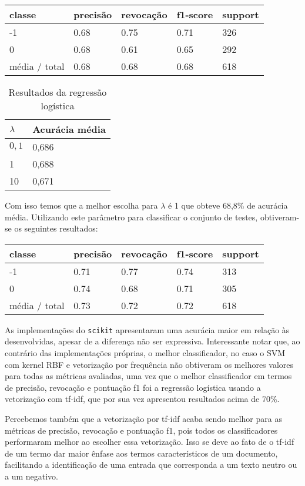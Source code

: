 \begin{table}[H]
	\centering
		\begin{tabular}{l | l | l | l | l}
		\hline
		classe  	&	precisão  &  revocação &  f1-score &  support \\
		\hline
		 -1    &   0.68   &   0.75   &   0.71   &    326 \\
		 \hline
          0    &   0.68   &   0.61   &   0.65   &    292 \\
		\hline
		média / total   &    0.68   &   0.68   &   0.68   &    618 \\
		\hline
	\end{tabular}
\end{table}

\begin{table}[H]
	\centering
	\caption{Resultados da regressão logística}
	\begin{tabular}{l l}
		\hline
		$\lambda$ & Acurácia média \\
		\hline
		$0,1$ & 0,686 \\
		\hline
		1 & 0,688 \\
		\hline
		10 & 0,671 \\
	\end{tabular}
\end{table}


Com isso temos que a melhor escolha para $\lambda$ é 1 que obteve 68,8\% de acurácia média.
Utilizando este parâmetro para classificar o conjunto de testes, obtiveram-se os seguintes resultados:

\begin{table}[H]
	\centering
		\begin{tabular}{l | l | l | l | l}
		\hline
		classe  	&	precisão  &  revocação &  f1-score &  support \\
		\hline
		 -1    &   0.71   &   0.77   &   0.74   &    313 \\
		 \hline
          0    &   0.74   &   0.68   &   0.71   &    305 \\
		\hline
		média / total   &    0.73   &   0.72   &   0.72   &    618 \\
		\hline
	\end{tabular}
\end{table}

As implementações do \texttt{scikit} apresentaram uma acurácia maior em relação às
desenvolvidas, apesar de a diferença não ser expressiva. Interessante notar que,
ao contrário das implementações próprias, o melhor classificador, no caso o SVM
com kernel RBF e vetorização por frequência não obtiveram os melhores valores para
todas as métricas avaliadas, uma vez que o melhor classificador em termos de
precisão, revocação e pontuação f1 foi a regressão logística usando a vetorização
com tf-idf, que por sua vez apresentou resultados acima de 70\%.

Percebemos também que a vetorização por tf-idf acaba sendo melhor para as métricas
de precisão, revocação e pontuação f1, pois todos os classificadores performaram
melhor ao escolher essa vetorização. Isso se deve ao fato de o tf-idf de um termo
dar maior ênfase aos termos característicos de um documento, facilitando a identificação
de uma entrada que corresponda a um texto neutro ou a um negativo.